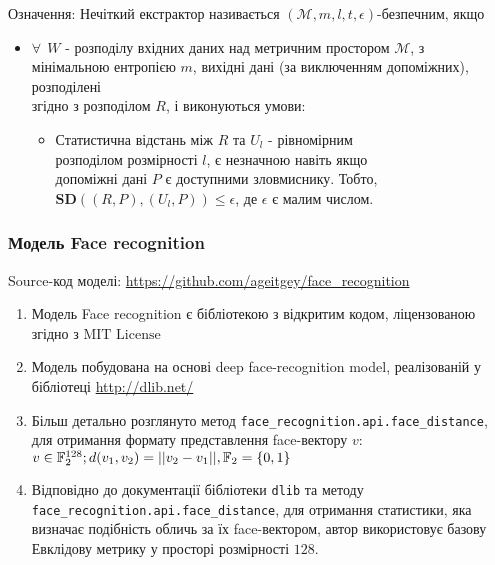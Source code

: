 \documentclass[11pt]{article}
\providecommand{\tightlist}{%
      \setlength{\itemsep}{0pt}\setlength{\parskip}{0pt}}
\begin{document}
Означення: Нечіткий екстрактор називається
\((\mathcal{M},m,l,t,\epsilon)\)-безпечним, якщо

\begin{itemize}
\tightlist
\item
  \(\forall ~~ W\) - розподілу вхідних даних над метричним простором
  \(\mathcal{M}\), з\\
  мінімальною ентропією \(m\), вихідні дані (за виключенням допоміжних),
  розподілені\\
  згідно з розподілом \(R\), і виконуються умови:

  \begin{itemize}
  \tightlist
  \item
    Статистична відстань між \(R\) та \(U_l\) - рівномірним\\
    розподілом розмірності \(l\), є незначною навіть якщо\\
    допоміжні дані \(P\) є доступними зловмиснику. Тобто,
    \(\textbf{SD}((R,P),(U_l,P)) \leq \epsilon\), де \(\epsilon\) є
    малим числом.
  \end{itemize}
\end{itemize}

    \hypertarget{ux43cux43eux434ux435ux43bux44c-face-recognition}{%
\subsubsection{Модель Face
recognition}\label{ux43cux43eux434ux435ux43bux44c-face-recognition}}

Source-код моделі: \url{https://github.com/ageitgey/face_recognition}

\begin{enumerate}
\def\labelenumi{\arabic{enumi}.}
\tightlist
\item
  Модель Face recognition є бібліотекою з відкритим кодом, ліцензованою
  згідно з \(\text{MIT License}\)
\item
  Модель побудована на основі deep face-recognition model, реалізованій
  у бібліотеці \url{http://dlib.net/}
\item
  Більш детально розглянуто метод
  \texttt{face\_recognition.api.face\_distance}, для отримання формату
  представлення face-вектору \(v\):
  \(v \in \mathbb{F}_2^{128}; \space d(v_1,v_2) = ||v_2-v_1||, \space \mathbb{F}_2 = \{0,1\}\)
\item
  Відповідно до документації бібліотеки \texttt{dlib} та методу
  \texttt{face\_recognition.api.face\_distance}, для отримання
  статистики, яка визначає подібність обличь за їх face-вектором, автор
  використовує базову Евклідову метрику у просторі розмірності \(128\).
\end{enumerate}
\end{document}
